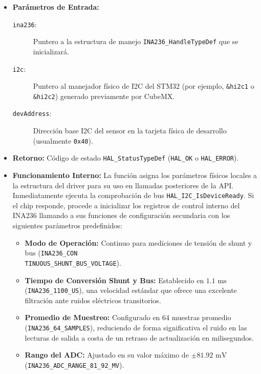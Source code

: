 \documentclass[
10pt, %
a4paper, %
oneside, %
headinclude,footinclude, %
BCOR5mm, %
]{scrartcl}
\begin{document}
\begin{itemize}
	\item \textbf{Parámetros de Entrada:}
		\begin{description}
			\item[\texttt{ina236}:] Puntero a la estructura de manejo \texttt{INA236\_HandleTypeDef} que se inicializará.
			\item[\texttt{i2c}:] Puntero al manejador físico de I2C del STM32 (por ejemplo, \texttt{\&hi2c1} o \texttt{\&hi2c2}) generado previamente por CubeMX.
			\item[\texttt{devAddress}:] Dirección base I2C del sensor en la tarjeta física de desarrollo (usualmente \texttt{0x40}).
		\end{description}
	\item \textbf{Retorno:} Código de estado \texttt{HAL\_StatusTypeDef} (\texttt{HAL\_OK} o \texttt{HAL\_ERROR}).
	\item \textbf{Funcionamiento Interno:}
		La función asigna los parámetros físicos locales a la estructura del driver para su uso en llamadas posteriores de la API. Inmediatamente ejecuta la comprobación de bus \texttt{HAL\_I2C\_IsDeviceReady}. Si el chip responde, procede a inicializar los registros de control interno del INA236 llamando a sus funciones de configuración secundaria con los siguientes parámetros predefinidos:
		\begin{itemize}
			\item \textbf{Modo de Operación:} Continuo para mediciones de tensión de shunt y bus (\texttt{INA236\_CON\\TINUOUS\_SHUNT\_BUS\_VOLTAGE}).
			\item \textbf{Tiempo de Conversión Shunt y Bus:} Establecido en $1.1\text{ ms}$ (\texttt{INA236\_1100\_US}), una velocidad estándar que ofrece una excelente filtración ante ruidos eléctricos transitorios.
			\item \textbf{Promedio de Muestreo:} Configurado en 64 muestras promedio (\texttt{INA236\_64\_SAMPLES}), reduciendo de forma significativa el ruido en las lecturas de salida a costa de un retraso de actualización en milisegundos.
			\item \textbf{Rango del ADC:} Ajustado en su valor máximo de $\pm 81.92\text{ mV}$ (\texttt{INA236\_ADC\_RANGE\_81\_92\_MV}).
		\end{itemize}
\end{itemize}
\end{document}
